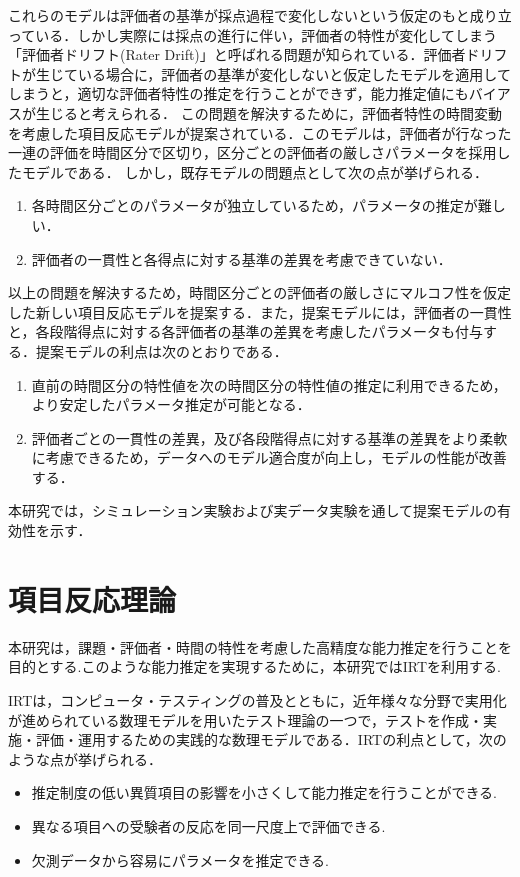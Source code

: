 \documentclass[a4paper,11pt,oneside,openany]{jsbook}
\begin{document}
これらのモデルは評価者の基準が採点過程で変化しないという仮定のもと成り立っている．しかし実際には採点の進行に伴い，評価者の特性が変化してしまう「評価者ドリフト(Rater Drift)」と呼ばれる問題が知られている．評価者ドリフトが生じている場合に，評価者の基準が変化しないと仮定したモデルを適用してしまうと，適切な評価者特性の推定を行うことができず，能力推定値にもバイアスが生じると考えられる．
この問題を解決するために，評価者特性の時間変動を考慮した項目反応モデルが提案されている\cite{raterdrift}．このモデルは，評価者が行なった一連の評価を時間区分で区切り，区分ごとの評価者の厳しさパラメータを採用したモデルである．
しかし，既存モデルの問題点として次の点が挙げられる．
\begin{enumerate}
  \item 各時間区分ごとのパラメータが独立しているため，パラメータの推定が難しい．
  \item 評価者の一貫性と各得点に対する基準の差異を考慮できていない．
\end{enumerate}  
以上の問題を解決するため，時間区分ごとの評価者の厳しさにマルコフ性を仮定した新しい項目反応モデルを提案する．また，提案モデルには，評価者の一貫性と，各段階得点に対する各評価者の基準の差異を考慮したパラメータも付与する．提案モデルの利点は次のとおりである．
\begin{enumerate}
  \item 直前の時間区分の特性値を次の時間区分の特性値の推定に利用できるため，より安定したパラメータ推定が可能となる．
  \item 評価者ごとの一貫性の差異，及び各段階得点に対する基準の差異をより柔軟に考慮できるため，データへのモデル適合度が向上し，モデルの性能が改善する．
\end{enumerate}
本研究では，シミュレーション実験および実データ実験を通して提案モデルの有効性を示す．
\newpage

\chapter{項目反応理論}
本研究は，課題・評価者・時間の特性を考慮した高精度な能力推定を行うことを目的とする.このような能力推定を実現するために，本研究ではIRTを利用する.

IRTは，コンピュータ・テスティングの普及とともに，近年様々な分野で実用化が進められている数理モデルを用いたテスト理論の一つで，テストを作成・実施・評価・運用するための実践的な数理モデルである\cite{IRTtext,IRTLord}．IRTの利点として，次のような点が挙げられる\cite{IRTUtoUeno}．
\begin{itemize}
\item 推定制度の低い異質項目の影響を小さくして能力推定を行うことができる.
\item 異なる項目への受験者の反応を同一尺度上で評価できる.
\item 欠測データから容易にパラメータを推定できる.
\end{itemize}
\end{document}
